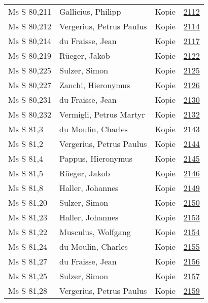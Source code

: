 \documentclass[10pt,a4paper,landscape]{report}
\begin{document}
\begin{longtable}{p{16cm}p{4cm}lr}
Ms S 80,211	&	Gallicius, Philipp	&	Kopie	&	\href{http://130.60.24.72/assignment/2112}{2112}\\
Ms S 80,212	&	Vergerius, Petrus Paulus	&	Kopie	&	\href{http://130.60.24.72/assignment/2114}{2114}\\
Ms S 80,214	&	du Fraisse, Jean	&	Kopie	&	\href{http://130.60.24.72/assignment/2117}{2117}\\
Ms S 80,219	&	Rüeger, Jakob	&	Kopie	&	\href{http://130.60.24.72/assignment/2122}{2122}\\
Ms S 80,225	&	Sulzer, Simon	&	Kopie	&	\href{http://130.60.24.72/assignment/2125}{2125}\\
Ms S 80,227	&	Zanchi, Hieronymus	&	Kopie	&	\href{http://130.60.24.72/assignment/2126}{2126}\\
Ms S 80,231	&	du Fraisse, Jean	&	Kopie	&	\href{http://130.60.24.72/assignment/2130}{2130}\\
Ms S 80,232	&	Vermigli, Petrus Martyr	&	Kopie	&	\href{http://130.60.24.72/assignment/2132}{2132}\\
Ms S 81,3	&	du Moulin, Charles	&	Kopie	&	\href{http://130.60.24.72/assignment/2143}{2143}\\
Ms S 81,2	&	Vergerius, Petrus Paulus	&	Kopie	&	\href{http://130.60.24.72/assignment/2144}{2144}\\
Ms S 81,4	&	Pappus, Hieronymus	&	Kopie	&	\href{http://130.60.24.72/assignment/2145}{2145}\\
Ms S 81,5	&	Rüeger, Jakob	&	Kopie	&	\href{http://130.60.24.72/assignment/2146}{2146}\\
Ms S 81,8	&	Haller, Johannes	&	Kopie	&	\href{http://130.60.24.72/assignment/2149}{2149}\\
Ms S 81,20	&	Sulzer, Simon	&	Kopie	&	\href{http://130.60.24.72/assignment/2150}{2150}\\
Ms S 81,23	&	Haller, Johannes	&	Kopie	&	\href{http://130.60.24.72/assignment/2153}{2153}\\
Ms S 81,22	&	Musculus, Wolfgang	&	Kopie	&	\href{http://130.60.24.72/assignment/2154}{2154}\\
Ms S 81,24	&	du Moulin, Charles	&	Kopie	&	\href{http://130.60.24.72/assignment/2155}{2155}\\
Ms S 81,27	&	du Fraisse, Jean	&	Kopie	&	\href{http://130.60.24.72/assignment/2156}{2156}\\
Ms S 81,25	&	Sulzer, Simon	&	Kopie	&	\href{http://130.60.24.72/assignment/2157}{2157}\\
Ms S 81,28	&	Vergerius, Petrus Paulus	&	Kopie	&	\href{http://130.60.24.72/assignment/2159}{2159}\\

\end{longtable}
\end{document}

